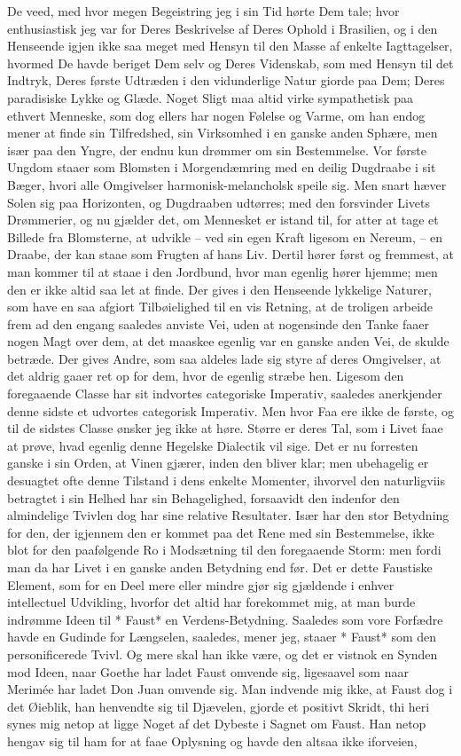 \documentclass[12pt,a4paper]{article}
\begin{document}
De veed, med hvor megen Begeistring jeg i sin Tid hørte Dem tale; hvor enthusiastisk jeg var for Deres Beskrivelse af Deres Ophold i Brasilien, og i den Henseende igjen ikke saa meget med Hensyn til den Masse af enkelte Iagttagelser, hvormed De havde beriget Dem selv og Deres Videnskab, som med Hensyn til det Indtryk, Deres første Udtræden i den vidunderlige Natur giorde paa Dem; Deres paradisiske Lykke og Glæde. Noget Sligt maa altid virke sympathetisk paa ethvert Menneske, som dog ellers har nogen Følelse og Varme, om han endog mener at finde sin Tilfredshed, sin Virksomhed i en ganske anden Sphære, men især paa den Yngre, der endnu kun drømmer om sin Bestemmelse. Vor første Ungdom staaer som Blomsten i Morgendæmring med en deilig Dugdraabe i sit Bæger, hvori alle Omgivelser harmonisk-melancholsk speile sig. Men snart hæver Solen sig paa Horizonten, og Dugdraaben udtørres; med den forsvinder Livets Drømmerier, og nu gjælder det, om Mennesket er istand til, for atter at tage et Billede fra Blomsterne, at udvikle – ved sin egen Kraft ligesom en Nereum, – en Draabe, der kan staae som Frugten af hans Liv. Dertil hører først og fremmest, at man kommer til at staae i den Jordbund, hvor man egenlig hører hjemme; men den er ikke altid saa let at finde. Der gives i den Henseende lykkelige Naturer, som have en saa afgiort Tilbøielighed til en vis Retning, at de troligen arbeide frem ad den engang saaledes anviste Vei, uden at nogensinde den Tanke faaer nogen Magt over dem, at det maaskee egenlig var en ganske anden Vei, de skulde betræde. Der gives Andre, som saa aldeles lade sig styre af deres Omgivelser, at det aldrig gaaer ret op for dem, hvor de egenlig stræbe hen. Ligesom den foregaaende Classe har sit indvortes categoriske Imperativ, saaledes anerkjender denne sidste et udvortes categorisk Imperativ. Men hvor Faa ere ikke de første, og til de sidstes Classe ønsker jeg ikke at høre. Større er deres Tal, som i Livet faae at prøve, hvad egenlig denne Hegelske Dialectik vil sige. Det er nu forresten ganske i sin Orden, at Vinen gjærer, inden den bliver klar; men ubehagelig er desuagtet ofte denne Tilstand i dens enkelte Momenter, ihvorvel den naturligviis betragtet i sin Helhed har sin Behagelighed, forsaavidt den indenfor den almindelige Tvivlen dog har sine relative Resultater. Især har den stor Betydning for den, der igjennem den er kommet paa det Rene med sin Bestemmelse, ikke blot for den paafølgende Ro i Modsætning til den foregaaende Storm: men fordi man da har Livet i en ganske anden Betydning end før. Det er dette Faustiske Element, som for en Deel mere eller mindre gjør sig gjældende i enhver intellectuel Udvikling, hvorfor det altid har forekommet mig, at man burde indrømme Ideen til * Faust* en Verdens-Betydning. Saaledes som vore Forfædre havde en Gudinde for Længselen, saaledes, mener jeg, staaer * Faust* som den personificerede Tvivl. Og mere skal han ikke være, og det er vistnok en Synden mod Ideen, naar Goethe har ladet Faust omvende sig, ligesaavel som naar Merimée har ladet Don Juan omvende sig. Man indvende mig ikke, at Faust dog i det Øieblik, han henvendte sig til Djævelen, gjorde et positivt Skridt, thi heri synes mig netop at ligge Noget af det Dybeste i Sagnet om Faust. Han netop hengav sig til ham for at faae Oplysning og havde den altsaa ikke iforveien, 
\end{document}
